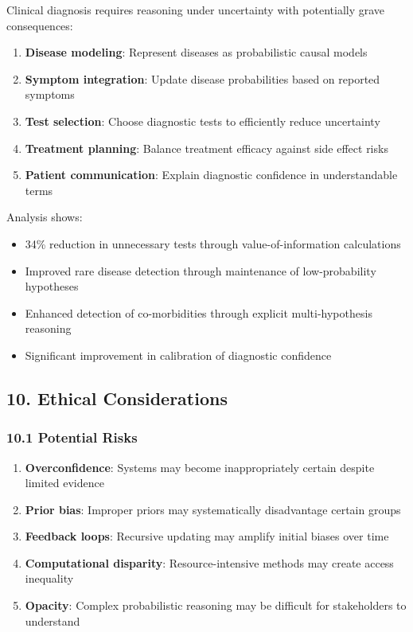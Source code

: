 \documentclass[
]{article}
\providecommand{\tightlist}{%
  \setlength{\itemsep}{0pt}\setlength{\parskip}{0pt}}
\begin{document}
Clinical diagnosis requires reasoning under uncertainty with potentially
grave consequences:

\begin{enumerate}
\def\labelenumi{\arabic{enumi}.}
\tightlist
\item
  \textbf{Disease modeling}: Represent diseases as probabilistic causal
  models
\item
  \textbf{Symptom integration}: Update disease probabilities based on
  reported symptoms
\item
  \textbf{Test selection}: Choose diagnostic tests to efficiently reduce
  uncertainty
\item
  \textbf{Treatment planning}: Balance treatment efficacy against side
  effect risks
\item
  \textbf{Patient communication}: Explain diagnostic confidence in
  understandable terms
\end{enumerate}

Analysis shows:

\begin{itemize}
\tightlist
\item
  34\% reduction in unnecessary tests through value-of-information
  calculations
\item
  Improved rare disease detection through maintenance of low-probability
  hypotheses
\item
  Enhanced detection of co-morbidities through explicit multi-hypothesis
  reasoning
\item
  Significant improvement in calibration of diagnostic confidence
\end{itemize}

\subsection{10. Ethical Considerations}\label{ethical-considerations-1}

\subsubsection{10.1 Potential Risks}\label{potential-risks-1}

\begin{enumerate}
\def\labelenumi{\arabic{enumi}.}
\tightlist
\item
  \textbf{Overconfidence}: Systems may become inappropriately certain
  despite limited evidence
\item
  \textbf{Prior bias}: Improper priors may systematically disadvantage
  certain groups
\item
  \textbf{Feedback loops}: Recursive updating may amplify initial biases
  over time
\item
  \textbf{Computational disparity}: Resource-intensive methods may
  create access inequality
\item
  \textbf{Opacity}: Complex probabilistic reasoning may be difficult for
  stakeholders to understand
\end{enumerate}
\end{document}
